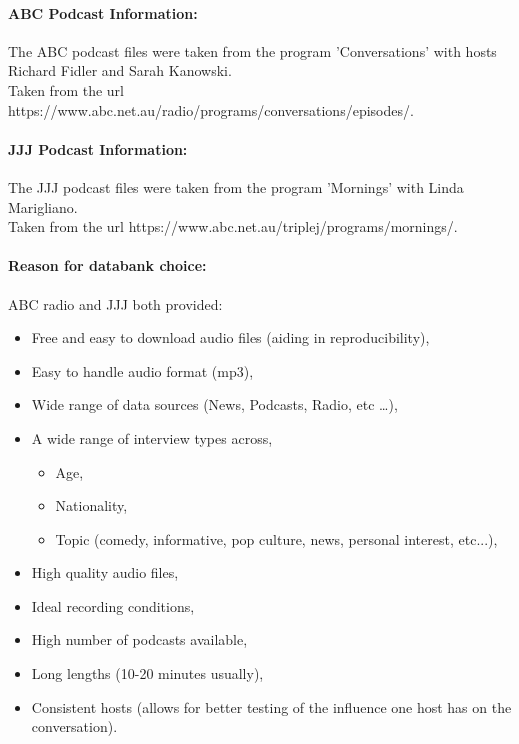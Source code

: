 

\paragraph{ABC Podcast Information:} The ABC podcast files were taken from the program 'Conversations' with hosts Richard Fidler and Sarah Kanowski. \\
Taken from the url https://www.abc.net.au/radio/programs/conversations/episodes/.

\paragraph{JJJ Podcast Information:} The JJJ podcast files were taken from the program 'Mornings' with Linda Marigliano. \\
Taken from the url https://www.abc.net.au/triplej/programs/mornings/. 

\paragraph{Reason for databank choice:} ABC radio and JJJ both provided:

\begin{itemize}
	\item Free and easy to download audio files (aiding in reproducibility),
	\item Easy to handle audio format (mp3),
	\item Wide range of data sources (News, Podcasts, Radio, etc \ldots),
	\item A wide range of interview types across,
	\begin{itemize}
		\item Age,
		\item Nationality,
		\item Topic (comedy, informative, pop culture, news, personal interest, etc...),
	\end{itemize}
	\item High quality audio files,
	\item Ideal recording conditions,
	\item High number of podcasts available,
	\item Long lengths (10-20 minutes usually),
	\item Consistent hosts (allows for better testing of the influence one host has on the conversation).
\end{itemize}

